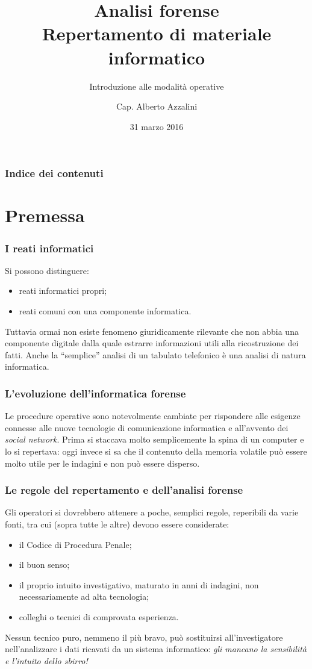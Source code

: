 \documentclass[11pt]{beamer}
\author{Cap. Alberto Azzalini}
\title[Analisi Forense]{Analisi forense\\Repertamento di materiale informatico}
\subtitle{Introduzione alle modalità operative}
\institute{Legione Carabinieri ``Trentino Alto Adige''\\Comando Provinciale di Bolzano\\Compagnia di Vipiteno}
\date{31 marzo 2016}
\begin{document}
	\maketitle
	
	\begin{frame}
		\frametitle{Indice dei contenuti}
		\tableofcontents
	\end{frame}

	\section{Premessa}
	\begin{frame}
		\frametitle{I reati informatici}
		Si possono distinguere:
		\begin{itemize}
			\item reati informatici propri;
			\item reati comuni con una componente informatica.
		\end{itemize}  
				
		Tuttavia ormai non esiste fenomeno giuridicamente rilevante che non abbia una componente digitale dalla quale estrarre informazioni utili alla ricostruzione dei fatti.
		\vfill
		Anche la ``semplice'' analisi di un tabulato telefonico è una analisi di natura informatica.
				
	\end{frame}
	
	\begin{frame}
		\frametitle{L'evoluzione dell'informatica forense}
			Le procedure operative sono notevolmente cambiate per rispondere alle esigenze connesse alle nuove tecnologie di comunicazione informatica e all'avvento dei \textit{social network}.
			\vfill
			Prima si staccava molto semplicemente la spina di un computer e lo si repertava: oggi invece si sa che il contenuto della memoria volatile può essere molto utile per le indagini e non può essere disperso.
	\end{frame}
	
	\begin{frame}
		\frametitle{Le regole del repertamento e dell'analisi forense}
		Gli operatori si dovrebbero attenere a poche, semplici regole, reperibili da varie fonti, tra cui (sopra tutte le altre) devono essere considerate:
		\begin{itemize}
			\item il Codice di Procedura Penale;
			\item il buon senso;
			\item il proprio intuito investigativo, maturato in anni di indagini, non necessariamente ad alta tecnologia;
			\item colleghi o tecnici di comprovata esperienza.
		\end{itemize}
		\vfill
		Nessun tecnico puro, nemmeno il più bravo, può sostituirsi all'investigatore nell'analizzare i dati ricavati da un sistema informatico: \textit{gli mancano la sensibilità e l'intuito dello sbirro!}
		
	\end{frame}
	
\end{document}
